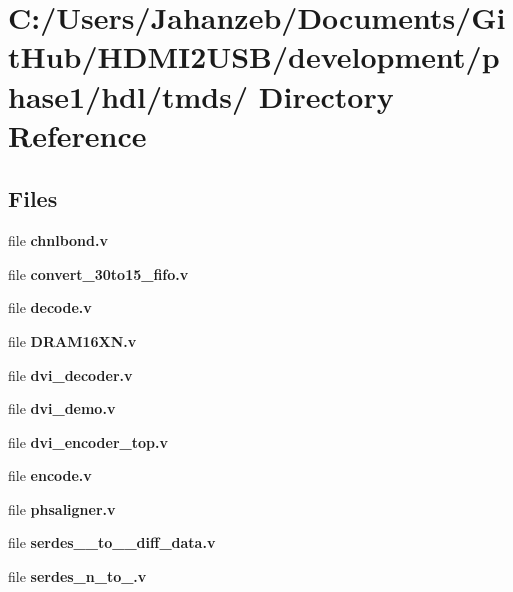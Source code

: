 \section{C\-:/\-Users/\-Jahanzeb/\-Documents/\-Git\-Hub/\-H\-D\-M\-I2\-U\-S\-B/development/phase1/hdl/tmds/ Directory Reference}
\label{dir_374aec5567acefe7a47ba09ac761cfc7}
\subsection*{Files}
\begin{DoxyCompactItemize}
\item 
file {\bf chnlbond.\-v}
\item 
file {\bf convert\-\_\-30to15\-\_\-fifo.\-v}
\item 
file {\bf decode.\-v}
\item 
file {\bf D\-R\-A\-M16\-X\-N.\-v}
\item 
file {\bf dvi\-\_\-decoder.\-v}
\item 
file {\bf dvi\-\_\-demo.\-v}
\item 
file {\bf dvi\-\_\-encoder\-\_\-top.\-v}
\item 
file {\bf encode.\-v}
\item 
file {\bf phsaligner.\-v}
\item 
file {\bf serdes\-\_\-\_\-to\-\_\-\_\-diff\-\_\-data.\-v}
\item 
file {\bf serdes\-\_\-n\-\_\-to\-\_.\-v}
\end{DoxyCompactItemize}
